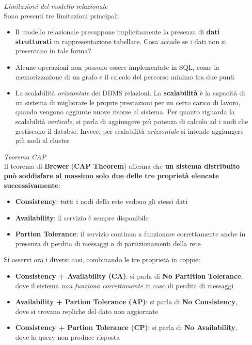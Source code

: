 \documentclass{article}
\begin{document}
\textit{Limitazioni del modello relazionale}\\
Sono presenti tre limitazioni principali:
\begin{itemize}[label={-}, leftmargin=1cm]
    \item Il modello relazionale presuppone implicitamente la presenza di \textbf{dati strutturati} in rappresentazione tabellare. Cosa accade se i dati non si presentano in tale forma?
    \item Alcune operazioni non possono essere implementate in SQL, come la memorizzazione di un grafo e il calcolo del percorso minimo tra due punti
    \item La scalabilità \textit{orizzontale} dei DBMS relazioni. La \textbf{scalabilità} è la capacità di un sistema di migliorare le proprie prestazioni per un certo carico di lavoro, quando vengono aggiunte nuove risorse al sistema. Per quanto riguarda la scalabilità \textit{verticale}, si parla di aggiungere più potenza di calcolo ad i nodi che gestiscono il databse. Invece, per scalabilità \textit{orizzontale} si intende aggiungere più nodi al cluster
\end{itemize}
\textit{Teorema CAP}\\
Il teorema di \textbf{Brewer} (\textbf{CAP Theorem}) afferma che \textbf{un sistema distribuito può soddisfare \underline{al massimo solo due} delle tre proprietà elencate successivamente}:
\begin{itemize}[label={-}, leftmargin=1cm]
    \item \textbf{Consistency}: tutti i nodi della rete vedono gli stessi dati
    \item \textbf{Availability}: il servizio è sempre disponibile
    \item \textbf{Partion Tolerance}: il servizio continua a funzionare correttamente anche in presenza di perdita di messaggi o di partizionamenti della rete
\end{itemize}
Si osservi ora i diversi casi, combinando le tre proprietà in coppie:
\begin{itemize}[label={-}, leftmargin=1cm]
    \item \textbf{Consistency + Availability (CA)}: si parla di \textbf{No Partition Tolerance}, dove il sistema \textit{non funziona correttamente} in caso di perdita di messaggi
    \item \textbf{Availability + Partion Tolerance (AP)}: si parla di \textbf{No Consistency}, dove si trovano repliche del dato non aggiornate
    \item \textbf{Consistency + Partion Tolerance (CP)}: si parla di \textbf{No Availability}, dove la query non produce risposta\\
\end{itemize}
\end{document}
